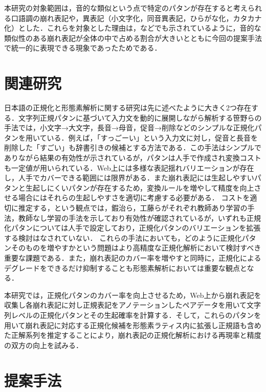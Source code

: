 \documentclass[japanese]{jnlp_1.4}
\begin{document}
本研究の対象範囲は，音的な類似という点で特定のパタンが存在すると考えられる口語調の崩れ表記や，異表記（小文字化，同音異表記，ひらがな化，カタカナ化）とした．これらを対象とした理由は，\cite{saito-EtAl:2014:Coling,kaji-kitsuregawa:2014:EMNLP2014}などでも示されているように，音的な類似性のある崩れ表記が全体の中で占める割合が大きいとともに今回の提案手法で統一的に表現できる現象であったためである．


\section{関連研究}

日本語の正規化と形態素解析に関する研究は先に述べたように大きく2つ存在する．文字列正規パタンに基づいて入力文を動的に展開しながら解析する笹野らの手法\cite{sasano-kurohashi-okumura2013IJCNLP}では，小文字→大文字，長音→母音，促音→削除などのシンプルな正規化パタンを用いている．例えば，「すっごーい」という入力文に対し，促音と長音を削除した「すごい」も辞書引きの候補とする方法である．この手法はシンプルでありながら結果の有効性が示されているが，パタンは人手で作成され変換コストも一定値が用いられている．Web上には多様な表記揺れバリエーションが存在し，人手でカバーできる範囲には限界がある．また崩れ表記には生起しやすいパタンと生起しにくいパタンが存在するため，変換ルールを増やして精度を向上させる場合にはそれらの生起しやすさを適切に考慮する必要がある．
コストを適切に推定する，という観点では，鍜治ら\cite{kaji-kitsuregawa:2014:EMNLP2014}，工藤ら\cite{kudo:2012}がそれぞれ教師あり学習の手法，教師なし学習の手法を示しており有効性が確認されているが，いずれも正規化パタンについては人手で設定しており，正規化パタンのバリエーションを拡張する検討はなされていない．
これらの手法においても，どのように正規化パタンそのものを増やすかという問題はより高精度な正規化解析において検討すべき重要な課題である．また，崩れ表記のカバー率を増やすと同時に，正規化によるデグレードをできるだけ抑制することも形態素解析においては重要な観点となる．

本研究では，正規化パタンのカバー率を向上させるため，Web上から崩れ表記を収集し各崩れ表記に対し正規表記をアノテーションしたペアデータを用いて文字列レベルの正規化パタンとその生起確率を計算する．そして，これらのパタンを用いて崩れ表記に対応する正規化候補を形態素ラティス内に拡張し正規語も含めた正解系列を推定することにより，崩れ表記の正規化解析における再現率と精度の双方の向上を試みる．


\section{提案手法}
\end{document}
